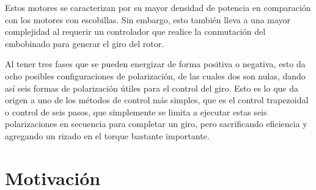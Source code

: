 \documentclass[11pt]{report}
\begin{document}
Estos motores se caracterizan por su mayor densidad de potencia en comparación con los motores con escobillas. Sin embargo, esto también lleva a una mayor complejidad al requerir un controlador que realice la conmutación del embobinado para generar el giro del rotor.


Al tener tres fases que se pueden energizar de forma positiva o negativa, esto da ocho posibles configuraciones de polarización, de las cuales dos son nulas, dando así seis formas de polarización útiles para el control del giro. Esto es lo que da origen a uno de los métodos de control más simples, que es el control trapezoidal o control de seis pasos, que simplemente se limita a ejecutar estas seis polarizaciones en secuencia para completar un giro, pero sacrificando eficiencia y agregando un rizado en el torque bastante importante.



\section{Motivación}

\end{document}
